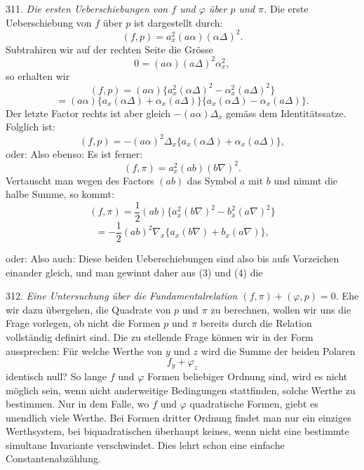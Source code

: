 311. \textit{Die ersten Ueberschiebungen von $f$ und $\varphi$ über $p$
und $\pi$.} Die erste Ueberschiebung von $f$ über $p$ ist dargestellt
durch:
\[
(f, p) = a_x^2(a\alpha)(\alpha\Delta)^2.
\]
Subtrahiren wir auf der rechten Seite die Grösse
\[
0 = (a\alpha)(a\Delta)^2\alpha_x^2,
\]
so erhalten wir
\[
(f, p) = (a\alpha)\{a_x^2(\alpha\Delta)^2 - \alpha_x^2(a\Delta)^2\}
\]
\[
= (a\alpha)\{a_x(\alpha\Delta) + \alpha_x(a\Delta)\}\{a_x(\alpha\Delta) - \alpha_x(a\Delta)\}.
\]
Der letzte Factor rechts ist aber gleich $-(a\alpha)\Delta_x$ gemäss dem
Identitätssatze. Folglich ist:
\[
(f, p) = -(a\alpha)^2\Delta_x\{a_x(\alpha\Delta) + \alpha_x(a\Delta)\},
\]
oder:
Also ebenso:
Es ist ferner:
\[
(f, \pi) = a_x^2(ab)(b\nabla)^2.
\]
Vertauscht man wegen des Factors $(ab)$ das Symbol $a$ mit $b$ und
nimmt die halbe Summe, so kommt:
\[
(f, \pi) = \frac{1}{2}(ab)\{a_x^2(b\nabla)^2 - b_x^2(a\nabla)^2\}
\]
\[
= -\frac{1}{2}(ab)^2\nabla_x\{a_x(b\nabla) + b_x(a\nabla)\},
\]


oder:
Also auch:
Diese beiden Ueberschiebungen sind also bis aufs Vorzeichen einander
gleich, und man gewinnt daher aus (3) und (4) die

312. \textit{Eine Untersuchung über die Fundamentalrelation
$(f, \pi)+(\varphi, p)=0$.} Ehe wir dazu übergehen, die Quadrate von $p$
und $\pi$ zu berechnen, wollen wir uns die Frage vorlegen, ob nicht die
Formen $p$ und $\pi$ bereits durch die Relation
vollständig definirt sind. Die zu stellende Frage können wir in der
Form aussprechen: Für welche Werthe von $y$ und $z$ wird die Summe der
beiden Polaren
\[
f_y + \varphi_z
\]
identisch null? So lange $f$ und $\varphi$ Formen beliebiger Ordnung
sind, wird es nicht möglich sein, wenn nicht anderweitige Bedingungen
stattfinden, solche Werthe zu bestimmen. Nur in dem Falle, wo $f$ und
$\varphi$ quadratische Formen, giebt es unendlich viele Werthe. Bei
Formen dritter Ordnung findet man nur ein einziges Werthsystem, bei
biquadratischen überhaupt keines, wenn nicht eine bestimmte simultane
Invariante verschwindet. Dies lehrt schon eine einfache
Constantenabzählung.


